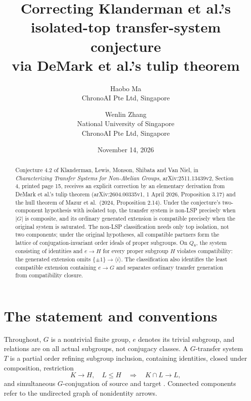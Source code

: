 \documentclass[11pt]{article}
\title{Correcting Klanderman et al.'s isolated-top transfer-system conjecture\\
via DeMark et al.'s tulip theorem}
\author{Haobo Ma\\\small ChronoAI Pte Ltd, Singapore
\and Wenlin Zhang\\\small National University of Singapore\\\small ChronoAI Pte Ltd, Singapore}
\date{November 14, 2026}
\begin{document}
\maketitle
\begin{abstract}
Conjecture 4.2 of Klanderman, Lewis, Monson, Shibata and Van Niel, in
\emph{Characterizing Transfer Systems for Non-Abelian Groups},
arXiv:2511.13439v2, Section 4, printed page 15, receives an explicit
correction by an elementary derivation from DeMark et al.'s tulip theorem
(arXiv:2604.00335v1, 1 April 2026, Proposition 3.17) and the hull theorem
of Mazur et al.\ (2024, Proposition 2.14).
Under the conjecture's two-component hypothesis with isolated top,
the transfer system is non-LSP precisely when $|G|$ is composite, and its
ordinary generated extension is compatible precisely when the original
system is saturated.
The non-LSP classification needs only top isolation, not two components;
under the original hypotheses, all compatible partners form the lattice of
conjugation-invariant order ideals of proper subgroups.
On $Q_8$, the system consisting of identities and
$e\to H$ for every proper subgroup $H$ violates compatibility: the generated
extension omits $\{\pm1\}\to\langle i\rangle$.
The classification also identifies the least compatible extension containing
$e\to G$ and separates ordinary transfer generation from compatibility closure.
\end{abstract}

\section{The statement and conventions}
Throughout, $G$ is a nontrivial finite group, $e$ denotes its trivial subgroup,
and relations are on all actual subgroups, not conjugacy classes.
A $G$-transfer system $T$ is a partial order refining subgroup inclusion,
containing identities, closed under composition, restriction
\[
 K\to H,\quad L\leq H\quad\Longrightarrow\quad K\cap L\to L,
\]
and simultaneous $G$-conjugation of source and target
\cite[Definition 2.1]{K}.
Connected components refer to the undirected graph of nonidentity arrows.
\end{document}
